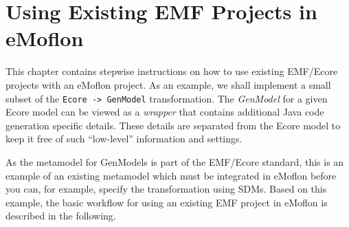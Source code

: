 \newpage

\section{Using Existing EMF Projects in eMoflon}
\genHeader

This chapter contains stepwise instructions on how to use existing \mbox{EMF}/\-Ecore projects with an eMoflon project.  As an example, we shall implement a
small subset of the \texttt{Ecore -> GenModel} transformation. The \emph{GenModel} for a given Ecore model can be viewed as a \emph{wrapper} that contains
additional Java code generation specific details. These details are separated from the Ecore model to keep it free of such ``low-level'' information and
settings.

As the metamodel for \textsf{GenModels} is part of the EMF/Ecore standard, this is an example of an existing metamodel which must be integrated in eMoflon
before you can, for example, specify the transformation using SDMs.
Based on this example, the basic workflow for using an existing EMF project in eMoflon is described in the following.




